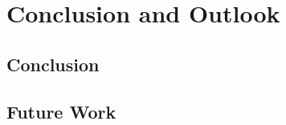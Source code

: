 \chapter{Conclusion and Outlook}

\section{Conclusion}
\label{sec:conclusion}



\section{Future Work}
\label{sec:outlook}

